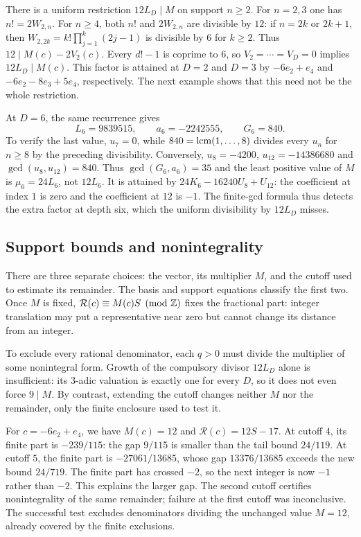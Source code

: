 \documentclass[11pt]{article}
\begin{document}
There is a uniform restriction $12L_D\mid M$ on support $n\ge2$.
For $n=2,3$ one has $n!=2W_{2,n}$. For $n\ge4$, both $n!$ and
$2W_{2,n}$ are divisible by $12$: if $n=2k$ or $2k+1$, then
$W_{2,2k}=k!\prod_{j=1}^k(2j-1)$ is divisible by $6$ for $k\ge2$.
Thus $12\mid M(c)-2V_2(c)$. Every $d!-1$ is coprime to $6$, so
$V_2=\cdots=V_D=0$ implies $12L_D\mid M(c)$.
This factor is attained at $D=2$ and $D=3$ by
$-6e_2+e_4$ and $-6e_2-8e_3+5e_4$, respectively.
The next example shows that this need not be the whole restriction.

At $D=6$, the same recurrence
gives
\[
 L_6=9839515,\qquad a_6=-2242555,\qquad G_6=840.
\]
To verify the last value, $u_7=0$, while $840=\operatorname{lcm}(1,\ldots,8)$ divides
every $u_n$ for $n\ge8$ by the preceding divisibility. Conversely,
$u_8=-4200$, $u_{12}=-14386680$ and $\gcd(u_8,u_{12})=840$.
Thus $\gcd(G_6,a_6)=35$ and the least positive value of $M$ is $\mu_6=24L_6$,
not $12L_6$. It is attained by $24K_6-16240U_8+U_{12}$: the coefficient
at index $1$ is zero and the coefficient at $12$ is $-1$. The finite-gcd formula thus detects the extra factor at depth six,
which the uniform divisibility by $12L_D$ misses.

\subsection{Support bounds and nonintegrality}\label{long68:sec:support-and-remainder}

There are three separate choices: the vector, its multiplier $M$,
and the cutoff used to estimate its remainder. The basis and support
equations classify the first two. Once $M$ is fixed,
$\mathcal R(c)\equiv M(c)S\pmod{\mathbb{Z}}$ fixes the fractional part:
integer translation may put a representative near zero but cannot
change its distance from an integer.

To exclude every rational denominator, each $q>0$ must divide the
multiplier of some nonintegral form. Growth of the compulsory divisor
$12L_D$ alone is insufficient: its $3$-adic valuation is exactly one
for every $D$, so it does not even force $9\mid M$. By contrast,
extending the cutoff changes neither $M$ nor the remainder, only the
finite enclosure used to test it.

For $c=-6e_2+e_4$, we have $M(c)=12$ and $\mathcal R(c)=12S-17$. At cutoff $4$, its finite part is $-239/115$:
the gap $9/115$ is smaller than the tail bound $24/119$. At cutoff $5$,
the finite part is $-27061/13685$, whose gap $13376/13685$ exceeds the
new bound $24/719$. The finite part has crossed $-2$, so the next
integer is now $-1$ rather than $-2$. This explains the larger gap.
The second cutoff certifies nonintegrality of the same remainder;
failure at the first cutoff was inconclusive. The successful test
excludes denominators dividing the unchanged value $M=12$, already
covered by the finite exclusions.
\end{document}
